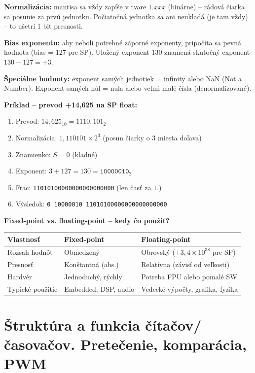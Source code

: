 \textbf{Normalizácia:} mantisa sa vždy zapíše v tvare $1.xxx$ (binárne) -- rádová čiarka sa posunie za prvú jednotku. Počiatočná jednotka sa ani neukladá (je tam vždy) -- to ušetrí 1 bit presnosti.

\textbf{Bias exponentu:} aby neboli potrebné záporné exponenty, pripočíta sa pevná hodnota (bias = 127 pre SP). Uložený exponent 130 znamená skutočný exponent $130 - 127 = +3$.

\textbf{Špeciálne hodnoty:} exponent samých jednotiek = infinity alebo NaN (Not a Number). Exponent samých núl = nula alebo veľmi malé čísla (denormalizované).

\textbf{Príklad -- prevod +14,625 na SP float:}
\begin{enumerate}
    \item Prevod: $14{,}625_{10} = 1110{,}101_2$
    \item Normalizácia: $1{,}110101 \times 2^3$ (posun čiarky o 3 miesta doľava)
    \item Znamienko: $S = 0$ (kladné)
    \item Exponent: $3 + 127 = 130 = \texttt{10000010}_2$
    \item Frac: \texttt{11010100000000000000000} (len časť za $1.$)
    \item Výsledok: \texttt{0\,10000010\,11010100000000000000000}
\end{enumerate}

\textbf{Fixed-point vs. floating-point -- kedy čo použiť?}
\begin{center}
\begin{tabular}{lll}
\toprule
\textbf{Vlastnosť} & \textbf{Fixed-point} & \textbf{Floating-point} \\
\midrule
Rozsah hodnôt        & Obmedzený                   & Obrovský ($\pm3{,}4{\times}10^{38}$ pre SP) \\
Presnosť             & Konštantná (abs.)           & Relatívna (závisí od veľkosti) \\
Hardvér              & Jednoduchý, rýchly          & Potreba FPU alebo pomalé SW \\
Typické použitie     & Embedded, DSP, audio        & Vedecké výpočty, grafika, fyzika \\
\bottomrule
\end{tabular}
\end{center}

\chapter{Štruktúra a funkcia čítačov/časovačov. Pretečenie, komparácia, PWM}

